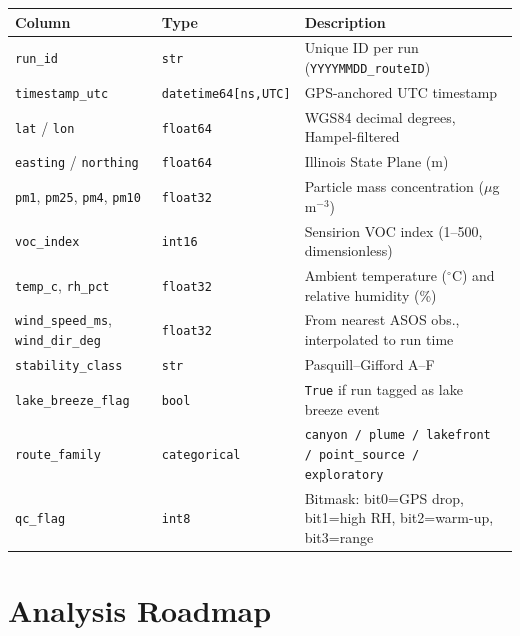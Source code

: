 \documentclass[11pt, letterpaper]{article}
\begin{document}
\medskip
\begin{center}
\small
\begin{tabular}{L{3.8cm} L{3.2cm} L{6.0cm}}
\toprule
{}
\color{white}\textbf{Column} &
\color{white}\textbf{Type} &
\color{white}\textbf{Description} \\
\midrule
\texttt{run\_id} & \texttt{str} & Unique ID per run (\texttt{YYYYMMDD\_routeID}) \\
\texttt{timestamp\_utc} & \texttt{datetime64[ns,UTC]} & GPS-anchored UTC timestamp \\
\texttt{lat} / \texttt{lon} & \texttt{float64} & WGS84 decimal degrees, Hampel-filtered \\
\texttt{easting} / \texttt{northing} & \texttt{float64} & Illinois State Plane (m) \\
\texttt{pm1}, \texttt{pm25}, \texttt{pm4}, \texttt{pm10} & \texttt{float32} & Particle mass concentration ($\mu$g\,m$^{-3}$) \\
\texttt{voc\_index} & \texttt{int16} & Sensirion VOC index (1--500, dimensionless) \\
\texttt{temp\_c}, \texttt{rh\_pct} & \texttt{float32} & Ambient temperature ($^\circ$C) and relative humidity (\%) \\
\texttt{wind\_speed\_ms}, \texttt{wind\_dir\_deg} & \texttt{float32} & From nearest ASOS obs., interpolated to run time \\
\texttt{stability\_class} & \texttt{str} & Pasquill--Gifford A--F \\
\texttt{lake\_breeze\_flag} & \texttt{bool} & \texttt{True} if run tagged as lake breeze event \\
\texttt{route\_family} & \texttt{categorical} & \texttt{canyon / plume / lakefront / point\_source / exploratory} \\
\texttt{qc\_flag} & \texttt{int8} & Bitmask: bit0=GPS drop, bit1=high RH, bit2=warm-up, bit3=range \\
\bottomrule
\end{tabular}
\end{center}

\newpage

\section{Analysis Roadmap}
\label{sec:analysis}
\end{document}
